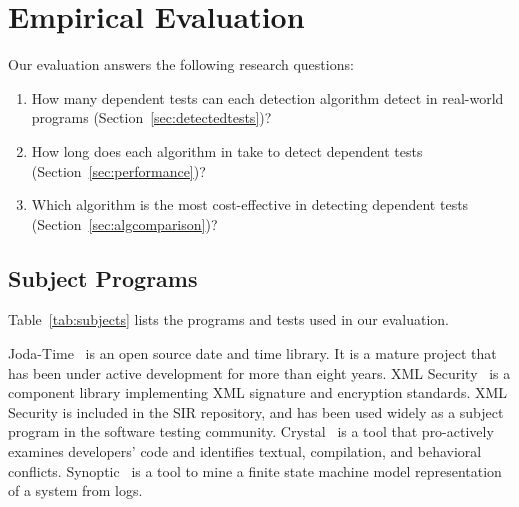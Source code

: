\section{Empirical Evaluation}
\label{sec:evaluation}



\newcommand{\jodatimetests}{3875\xspace}
\newcommand{\xmlsecuritytests}{108\xspace}
\newcommand{\crystaltests}{75\xspace}
\newcommand{\synoptictests}{118\xspace}
\newcommand{\totaltests}{4176\xspace}

\newcommand{\jodatimeautotests}{2639\xspace}
\newcommand{\xmlsecurityautotests}{665\xspace}
\newcommand{\crystalautotests}{3198\xspace}
\newcommand{\synopticautotests}{2467\xspace}
\newcommand{\totalautotests}{8969\xspace}




Our evaluation answers the following research questions:

\vspace{-1mm}

\begin{enumerate}
\vspace{-1mm}
\item How many dependent tests can each detection
algorithm detect in
real-world programs (Section~\ref{sec:detectedtests})?

\item How long does each algorithm in \ourtool take to detect dependent
tests (Section~\ref{sec:performance})?

\item Which algorithm is the most cost-effective in detecting
dependent tests (Section~\ref{sec:algcomparison})?
\end{enumerate}

\subsection{Subject Programs}


Table~\ref{tab:subjects} lists the programs and
tests used in our evaluation.

Joda-Time~\cite{jodatime} is an open source
date and time library. It is a mature project that
has been under active development
for more than eight years. XML Security~\cite{xmlsecurity}
is a component library implementing XML signature and encryption
standards. XML Security is included in
the SIR repository, and has been used widely
as a subject program in the software testing community.
Crystal~\cite{crystal} is a tool that
pro-actively examines developers' code and
identifies textual, compilation, and behavioral conflicts.
Synoptic~\cite{synoptic} is a tool to mine a finite state
machine model representation of a system from logs.

